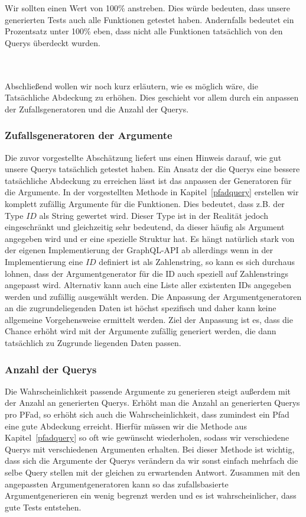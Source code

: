 Wir sollten einen Wert von 100\% anstreben.
Dies würde bedeuten, dass unsere generierten Tests auch alle Funktionen getestet haben.
Andernfalls bedeutet ein Prozentsatz unter 100\% eben, dass nicht alle Funktionen tatsächlich von den Querys überdeckt wurden.

\\
\\

Abschließend wollen wir noch kurz erläutern, wie es möglich wäre, die Tatsächliche Abdeckung zu erhöhen.
Dies geschieht vor allem durch ein anpassen der Zufallsgeneratoren und die Anzahl der Querys.

\subsubsection{Zufallsgeneratoren der Argumente}
\label{zufallsgen}

Die zuvor vorgestellte Abschätzung liefert uns einen Hinweis darauf, wie gut unsere Querys tatsächlich getestet haben.
Ein Ansatz der die Querys eine bessere tatsächliche Abdeckung zu erreichen lässt ist das anpassen der Generatoren für die Argumente.
In der vorgestellten Methode in Kapitel~\ref{pfadquery} erstellen wir komplett zufällig Argumente für die Funktionen.
Dies bedeutet, dass z.B. der Type $ID$ als String gewertet wird.
Dieser Type ist in der Realität jedoch eingeschränkt und gleichzeitig sehr bedeutend, da dieser häufig als Argument angegeben wird und er eine spezielle Struktur hat.
Es hängt natürlich stark von der eigenen Implementierung der GraphQL-API ab allerdings wenn in der Implementierung
eine $ID$ definiert ist als Zahlenstring, so kann es sich durchaus lohnen, dass der Argumentgenerator für die ID auch speziell
auf Zahlenstrings angepasst wird.
Alternativ kann auch eine Liste aller existenten IDs angegeben werden und zufällig ausgewählt werden.
Die Anpassung der Argumentgeneratoren an die zugrundeliegenden Daten ist höchst spezifisch und daher kann keine allgemeine
Vorgehensweise ermittelt werden.
Ziel der Anpassung ist es, dass die Chance erhöht wird mit der Argumente zufällig generiert werden, die dann tatsächlich zu Zugrunde liegenden Daten passen.

\subsubsection{Anzahl der Querys}

Die Wahrscheinlichkeit passende Argumente zu generieren steigt außerdem mit der Anzahl an generierten Querys.
Erhöht man die Anzahl an generierten Querys pro PFad, so erhöht sich auch die Wahrscheinlichkeit, dass zumindest ein Pfad
eine gute Abdeckung erreicht.
Hierfür müssen wir die Methode aus Kapitel~\ref{pfadquery} so oft wie gewünscht wiederholen, sodass wir verschiedene Querys mit verschiedenen Argumenten erhalten.
Bei dieser Methode ist wichtig, dass sich die Argumente der Querys verändern da wir sonst einfach mehrfach die selbe Query stellen mit der
gleichen zu erwartenden Antwort.
Zusammen mit den angepassten Argumentgeneratoren kann so das zufallsbasierte Argumentgenerieren ein wenig begrenzt werden
und es ist wahrscheinlicher, dass gute Tests entstehen.

